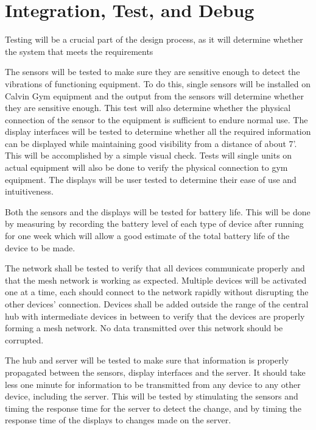 \documentclass[PPFS.tex]{template/subfiles}
\begin{document}
\section{Integration, Test, and Debug}

Testing will be a crucial part of the design process, as it will determine whether the system that meets the requirements 

The sensors will be tested to make sure they are sensitive enough to detect the vibrations of functioning equipment.  To do this, single sensors will be installed on Calvin Gym equipment and the output from the sensors will determine whether they are sensitive enough. This test will also determine whether the physical connection of the sensor to the equipment is sufficient to endure normal use.
The display interfaces will be tested to determine whether all the required information can be displayed while maintaining good visibility from a distance of about 7'. This will be accomplished by a simple visual check. Tests will single units on actual equipment will also be done to verify the physical connection to gym equipment. The displays will be user tested to determine their ease of use and intuitiveness.

Both the sensors and the displays will be tested for battery life. This will be done by measuring by recording the battery level of each type of device after running for one week which will allow a good estimate of the total battery life of the device to be made.

The network shall be tested to verify that all devices communicate properly and that the mesh network is working as expected. Multiple devices will be activated one at a time, each should connect to the network rapidly without disrupting the other devices’ connection. Devices shall be added outside the range of the central hub with intermediate devices in between to verify that the devices are properly forming a mesh network. No data transmitted over this network should be corrupted.

The hub and server will be tested to make sure that information is properly propagated between the sensors, display interfaces and the server. It should take less one minute for information to be transmitted from any device to any other device, including the server. This will be tested by stimulating the sensors and timing the response time for the server to detect the change, and by timing the response time of the displays to changes made on the server. 
\end{document}
